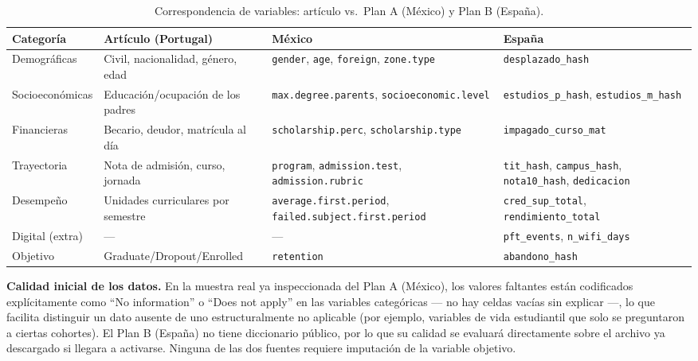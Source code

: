 \documentclass[11pt,a4paper]{article}
\newcommand{\dt}{.\allowbreak}
\newcommand{\us}{\_\allowbreak}
\begin{document}
\begin{table}[h!]
\centering
\footnotesize
\caption{Correspondencia de variables: artículo vs.\ Plan A (México) y Plan B (España).}
\label{tab:mapeo}
\begin{tabular}{p{2.6cm}p{3.7cm}p{3.9cm}p{3.9cm}}
\toprule
Categoría & Artículo (Portugal) & México & España \\
\midrule
Demográficas & Civil, nacionalidad, género, edad & \texttt{gender}, \texttt{age}, \texttt{foreign}, \texttt{zone\dt type} & \texttt{desplazado\us hash} \\
Socioeconómicas & Educación/ocupación de los padres & \texttt{max\dt degree\dt parents}, \texttt{socioeconomic\dt level} & \texttt{estudios\us p\us hash}, \texttt{estudios\us m\us hash} \\
Financieras & Becario, deudor, matrícula al día & \texttt{scholarship\dt perc}, \texttt{scholarship\dt type} & \texttt{impagado\us curso\us mat} \\
Trayectoria & Nota de admisión, curso, jornada & \texttt{program}, \texttt{admission\dt test}, \texttt{admission\dt rubric} & \texttt{tit\us hash}, \texttt{campus\us hash}, \texttt{nota10\us hash}, \texttt{dedicacion} \\
Desempeño & Unidades curriculares por semestre & \texttt{average\dt first\dt period}, \texttt{failed\dt subject\dt first\dt period} & \texttt{cred\us sup\us total}, \texttt{rendimiento\us total} \\
Digital (extra) & --- & --- & \texttt{pft\us events}, \texttt{n\us wifi\us days} \\
Objetivo & Graduate/Dropout/Enrolled & \texttt{retention} & \texttt{abandono\us hash} \\
\bottomrule
\end{tabular}
\end{table}

\textbf{Calidad inicial de los datos.} En la muestra real ya inspeccionada del Plan A (México), los valores faltantes están codificados explícitamente como ``No information'' o ``Does not apply'' en las variables categóricas --- no hay celdas vacías sin explicar ---, lo que facilita distinguir un dato ausente de uno estructuralmente no aplicable (por ejemplo, variables de vida estudiantil que solo se preguntaron a ciertas cohortes). El Plan B (España) no tiene diccionario público, por lo que su calidad se evaluará directamente sobre el archivo ya descargado si llegara a activarse. Ninguna de las dos fuentes requiere imputación de la variable objetivo.
\end{document}
